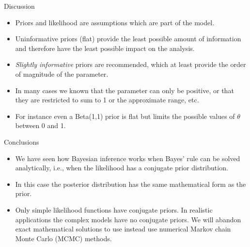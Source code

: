 \documentclass[
  13pt,
  ignorenonframetext,
]{beamer}
\begin{document}
\begin{frame}{Discussion}
\protect\hypertarget{discussion-1}{}
\begin{itemize}
\item
  Priors and likelihood are assumptions which are part of the model.
\item
  Uninformative priors (flat) provide the least possible amount of
  information and therefore have the least possible impact on the
  analysis.
\item
  \emph{Slightly informative} priors are recommended, which at least
  provide the order of magnitude of the parameter.
\item
  In many cases we known that the parameter can only be positive, or
  that they are restricted to sum to 1 or the approximate range, etc.
\item
  For instance even a Beta(1,1) prior is flat but limits the possible
  values of \(\theta\) between 0 and 1.
\end{itemize}
\end{frame}

\begin{frame}{Conclusions}
\protect\hypertarget{conclusions}{}
\begin{itemize}
\item
  We have seen how Bayesian inference works when Bayes' rule can be
  solved analytically, i.e., when the likelihood has a conjugate prior
  distribution.
\item
  In this case the posterior distribution has the same mathematical form
  as the prior.
\item
  Only simple likelihood functions have conjugate priors. In realistic
  applications the complex models have no conjugate priors. We will
  abandon exact mathematical solutions to use instead use numerical
  Markov chain Monte Carlo (MCMC) methods.
\end{itemize}
\end{frame}
\end{document}
